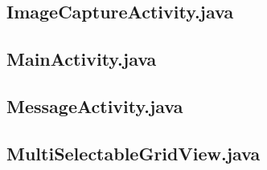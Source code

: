 \documentclass[11pt,a4j]{jarticle}
\begin{document}
\subsection{ImageCaptureActivity.java}
	
	\newpage
\subsection{MainActivity.java}
	
	\newpage
\subsection{MessageActivity.java}
	
	\newpage
\subsection{MultiSelectableGridView.java}
	
	\newpage
\end{document}
